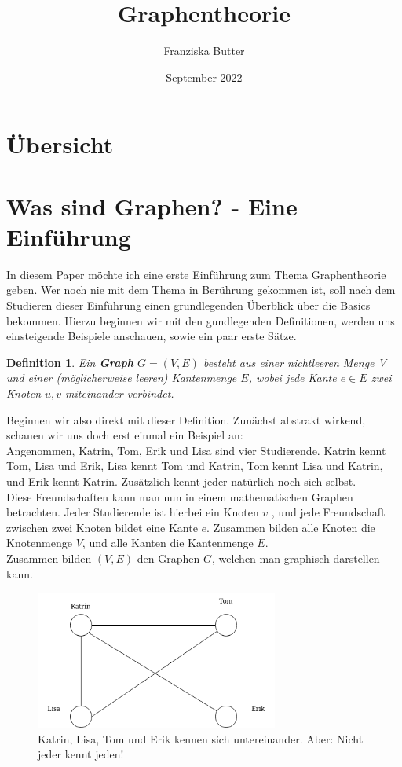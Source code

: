 \documentclass{article}
\title{Graphentheorie}
\author{Franziska Butter}
\date{September 2022}
\newtheorem{definition}{Definition}
\theoremstyle{plain}
\begin{document}
\maketitle

\section{Übersicht}
	\tableofcontents

\newpage

\section{Was sind Graphen? - Eine Einführung}
In diesem Paper möchte ich eine erste Einführung zum Thema Graphentheorie geben. Wer noch nie mit dem Thema in Berührung gekommen ist, soll nach dem Studieren dieser Einführung einen grundlegenden Überblick über die Basics bekommen. Hierzu beginnen wir mit den gundlegenden Definitionen, werden uns einsteigende Beispiele anschauen, sowie ein paar erste Sätze.\\
\bigskip
\begin{definition} 
            Ein \textbf{Graph} \( G = (V, E)\) besteht aus einer nichtleeren Menge V und einer (möglicherweise leeren) Kantenmenge \(E\), wobei jede Kante \(e \in E\) zwei Knoten \(u, v\) miteinander verbindet.\cite[S.~2]{bue_1}
\end{definition}
\bigskip
Beginnen wir also direkt mit dieser Definition. Zunächst abstrakt wirkend, schauen wir uns doch erst einmal ein Beispiel an:\\
Angenommen, Katrin, Tom, Erik und Lisa sind vier Studierende. Katrin kennt Tom, Lisa und Erik, Lisa kennt Tom und Katrin, Tom kennt Lisa und Katrin, und Erik kennt Katrin. Zusätzlich kennt jeder natürlich noch sich selbst.\\
Diese Freundschaften kann man nun in einem mathematischen Graphen betrachten. Jeder Studierende ist hierbei ein Knoten \(v\) , und jede Freundschaft zwischen zwei Knoten bildet eine Kante \(e\). Zusammen bilden alle Knoten die Knotenmenge \(V\), und alle Kanten die Kantenmenge \(E\).\\
Zusammen bilden \((V, E)\) den Graphen \(G\), welchen man graphisch darstellen kann.\\
\bigskip
\begin{figure}[!htp]
    \centering
    \includegraphics[width=8cm]{vortrag_schriftlich/images/graph_one.drawio.png}
    \caption{Katrin, Lisa, Tom und Erik kennen sich untereinander. Aber: Nicht jeder kennt jeden!}
    \label{fig:fig1}
\end{figure}
\end{document}
